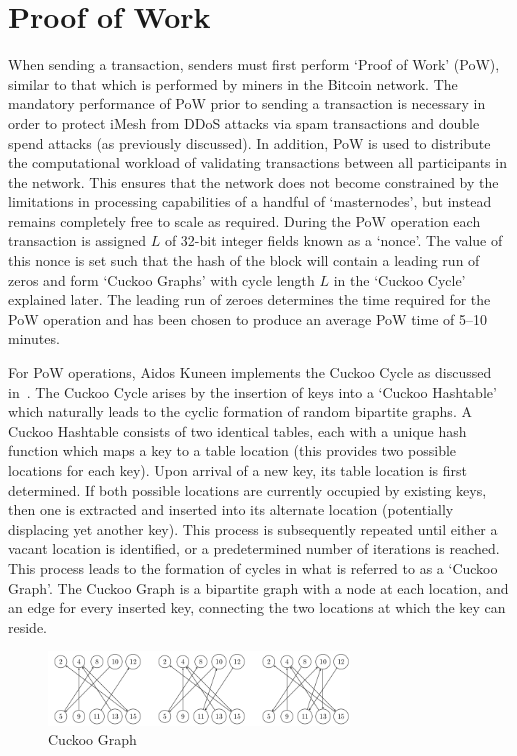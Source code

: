 \documentclass[a4paper,10pt,twocolumn]{article}
\begin{document}
\section{Proof of Work}
\label{sec:PoW}

When sending a transaction, senders must first perform `Proof of Work' (PoW), similar to that which is performed by miners in the 
Bitcoin network. The mandatory performance of PoW prior to sending a transaction is necessary in order to protect iMesh from DDoS 
attacks via spam transactions and double spend attacks (as previously discussed). In addition, PoW is used to distribute the 
computational workload of validating transactions between all participants in the network. This ensures that the network does not 
become constrained by the limitations in processing capabilities of a handful of `masternodes', but instead remains completely free to 
scale as required. During the PoW operation each transaction is assigned \(L\) of  32-bit integer fields known as a `nonce'. 
The value of this nonce is set such that the hash of the block will contain a leading run of zeros and form   `Cuckoo Graphs' with cycle length \(L\) in the `Cuckoo Cycle'
explained later. The leading run of zeroes determines the time required for the PoW operation and has been chosen to produce an 
average PoW time of 5--10 minutes.

For PoW operations, Aidos Kuneen implements the Cuckoo Cycle as discussed in~\cite{cuckoo}. The Cuckoo Cycle arises by the insertion of
keys into a `Cuckoo Hashtable' which naturally leads to the cyclic formation of random bipartite graphs. A Cuckoo Hashtable consists of 
two identical tables, each with a unique hash function which maps a key to a table location (this provides two possible locations for 
each key). Upon arrival of a new key, its table location is first determined. If both possible locations are currently occupied by 
existing keys, then one is extracted and inserted into its alternate location (potentially displacing yet another key). This process is 
subsequently repeated until either a vacant location is identified, or a predetermined number of iterations is reached. This process 
leads to the formation of cycles in what is referred to as a `Cuckoo Graph'. The Cuckoo Graph is a bipartite graph with a node at each 
location, and an edge for every inserted key, connecting the two locations at which the key can reside.

\begin{figure}[ht]
	\begin{center}
	\includegraphics[width=80mm]{cuckoo.png}
	  \caption{Cuckoo Graph}
    \label{fig:cuckoo}
	\end{center}
 \end{figure}
\end{document}

